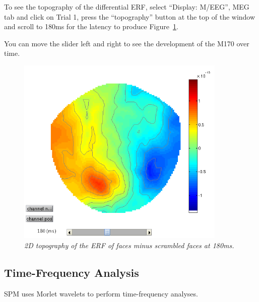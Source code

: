To see the topography of the differential ERF, select ``Display: M/EEG'', MEG tab and click on Trial 1, press the ``topography'' button at the top of the window and scroll to 180ms for the latency to produce Figure~\ref{multimodal:fig:12}.

You can move the slider left and right to see the development of the M170 over time.

\begin{figure}
\begin{center}
\includegraphics[width=100mm]{multimodal/figures/meg_topo180}
\caption{\em 2D topography of the ERF of faces minus scrambled faces at 180ms. \label{multimodal:fig:12}}
\end{center}
\end{figure}

\subsection{Time-Frequency Analysis}

SPM uses Morlet wavelets to perform time-frequency analyses.

